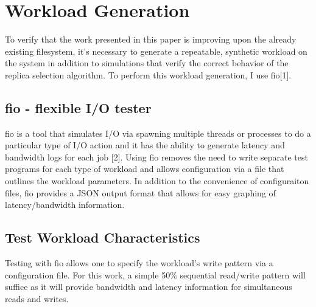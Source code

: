 \setlength{\topmargin}{-.5in}
\setlength{\textheight}{9in}
\setlength{\oddsidemargin}{.125in}
\setlength{\textwidth}{6.25in}

\author{Cyril Allen\\
Harvard Extension School}
\renewcommand{\today}{who knows}

\chapter{Workload Generation}

To verify that the work presented in this paper is improving upon the already
existing filesystem, it's necessary to generate a repeatable, synthetic
workload on the system in addition to simulations that verify the correct
behavior of the replica selection algorithm. To perform this workload
generation, I use fio[1].

\section{fio - flexible I/O tester}

fio is a tool that simulates I/O via spawning multiple threads or processes to
do a particular type of I/O action and it has the ability to generate latency
and bandwidth logs for each job [2]. Using fio removes the need to write
separate test programs for each type of workload and allows configuration via a
file that outlines the workload parameters. In addition to the convenience of
configuraiton files, fio provides a JSON output format that allows for easy
graphing of latency/bandwidth information.

\section{Test Workload Characteristics}

Testing with fio allows one to specify the workload's write pattern via a
configuration file. For this work, a simple 50\% sequential read/write pattern
will suffice as it will provide bandwidth and latency information for
simultaneous reads and writes.


